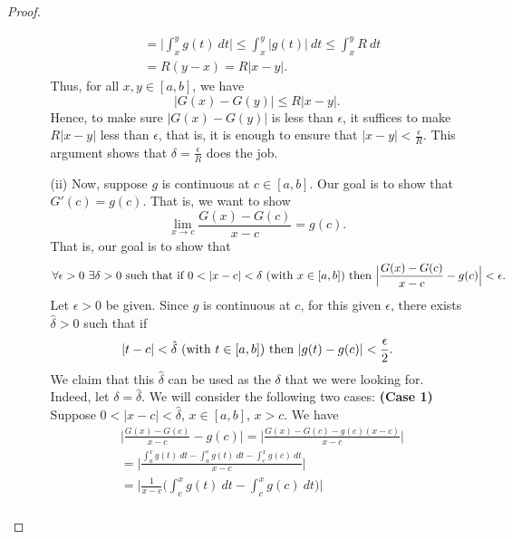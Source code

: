 \begin{proof}
\begin{enumerate}
\begin{enumerate}
\begin{align*}
                                         &= \Big| \int_{ x }^{ y }  g(t) \ dt  \Big|  \leq \int_{ x }^{ y }  | g(t) |  \ dt \leq \int_{ x }^{ y } R  \ dt \\
                                         &= R(y-x) = R| x - y   |. 
                    \end{align*}
                    Thus, for all \( x,y \in [a,b] \), we have 
                    \[  | G(x) - G(y) | \leq R | x - y  |.  \]
                    Hence, to make sure \( | G(x) - G(y) |  \) is less than \( \epsilon  \), it suffices to make \( R | x - y  |  \) less than \( \epsilon  \), that is, it is enough to ensure that \( | x - y  |  < \frac{ \epsilon }{ R  }  \). This argument shows that \( \delta = \frac{ \epsilon }{ R }  \) does the job. 
                \item[(ii)] Now, suppose \( g  \) is continuous at \( c \in [a,b] \). Our goal is to show that \( G'(c) = g(c) \). That is, we want to show 
                    \[  \lim_{ x \to c  }  \frac{ G(x)  - G(c) }{ x - c  }  = g(c). \]
                    That is, our goal is to show that 
                    \[  \forall \epsilon > 0 \ \exists \delta > 0 \ \text{such that} \ \text{if} \ 0 < | x - c  |  < \delta \ \text{(with \( x \in [a,b] \))} \ \text{then} \ \Big| \frac{ G(x) - G(c) }{ x - c  }  -  g(c) \Big|  < \epsilon. \]
                    Let \( \epsilon > 0  \) be given. Since \( g  \) is continuous at \( c  \), for this given \( \epsilon  \), there exists \( \hat{\delta} > 0  \) such that if
                    \[  | t - c  |  < \hat{\delta} \ \text{(with \( t \in [a,b] \))} \ \text{then} \ | g(t) - g(c) |  < \frac{ \epsilon }{ 2 }. \]
                    We claim that this \( \hat{\delta} \) can be used as the \( \delta  \) that we were looking for. Indeed, let \( \delta = \hat{\delta} \). We will consider the following two cases:
                    \textbf{(Case 1)} Suppose \( 0 < | x - c  |  < \hat{\delta} \), \( x \in [a,b] \), \( x > c  \). We have 
                    \begin{align*}
                        &\Big| \frac{ G(x) - G(c) }{  x-  c  }  - g(c) \Big| = \Big| \frac{ G(x) - G(c) - g(c) (x-c) }{ x - c  }  \Big|  \\
                        &= \Big| \frac{ \int_{ a }^{ x  }  g(t) \ dt - \int_{ a }^{ c }  g(t) \ dt - \int_{ c }^{ x }  g(c) \ dt  }{  x - c  }  \Big|  \\
                        &= \Big| \frac{ 1 }{ x - c  }  \Big(  \int_{ c }^{ x }  g(t) \ dt - \int_{ c }^{ x }  g(c) \ dt  \Big) \Big| \\

\end{align*}
\end{enumerate}
\end{enumerate}
\end{proof}

